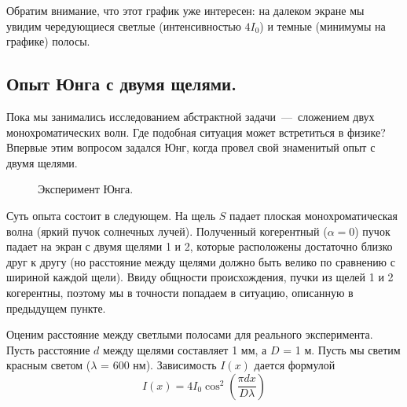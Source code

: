 \documentclass[11pt,a4paper]{article}
\numberwithin{equation}{section}
\begin{document}
Обратим внимание, что этот график уже интересен: на далеком экране мы
увидим чередующиеся светлые (интенсивностью $4I_0$) и темные (минимумы
на графике) полосы.

\subsection{Опыт Юнга с двумя щелями.}

Пока мы занимались исследованием абстрактной задачи~---~сложением двух
монохроматических волн. Где подобная ситуация может встретиться в
физике? Впервые этим вопросом задался Юнг, когда провел свой
знаменитый опыт с двумя щелями.

\begin{figure}[h]
  \centering
  \caption{Эксперимент Юнга.}
  \label{fig:yung}
\end{figure}

Суть опыта состоит в следующем. На щель $S$ падает плоская
монохроматическая волна (яркий пучок солнечных лучей). Полученный
когерентный ($\alpha = 0$) пучок падает на экран с двумя щелями 1 и 2,
которые расположены достаточно близко друг к другу (но расстояние
между щелями должно быть велико по сравнению с шириной каждой
щели). Ввиду общности происхождения, пучки из щелей 1 и 2 когерентны,
поэтому мы в точности попадаем в ситуацию, описанную в предыдущем
пункте.

Оценим расстояние между светлыми полосами для реального
эксперимента. Пусть расстояние $d$ между щелями составляет 1 мм, а $D$
= 1 м. Пусть мы светим красным светом ($\lambda$ = 600
нм). Зависимость $I(x)$ дается формулой
\begin{equation}
I(x) = 4 I_0 \cos^2 \left( \frac{\pi d x}{D \lambda} \right)
\end{equation}
\end{document}
